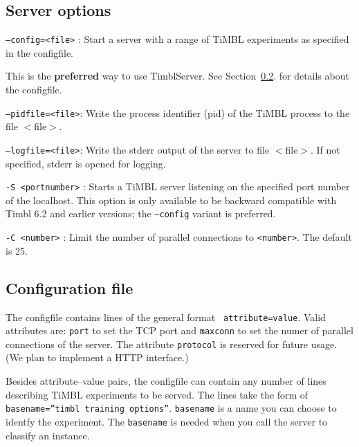 \documentclass{report}
\begin{document}
\subsection{Server options}

\begin{description}

\item {\tt --config=<file>} : Start a server with a range of TiMBL experiments as specified in the configfile.

This is the {\bf preferred} way to use TimblServer. See Section~\ref{configfile}. for details about the configfile.

\item {\tt --pidfile=<file>}: Write the process identifier (pid) of
the TiMBL process to the file $<$file$>$.

\item {\tt --logfile=<file>}: Write the stderr output of the server to
 file $<$file$>$. If not specified, stderr is opened for logging.

\item {\tt -S <portnumber>} : Starts a TiMBL server listening on the
  specified port number of the localhost.  This option is only
  available to be backward compatible with Timbl 6.2 and earlier
  versions; the {\tt --config} variant is preferred.

\item {\tt -C <number>} : Limit the number of parallel connections to
  {\tt <number>}. The default is 25.

\end{description}

\subsection{Configuration file}
\label{configfile}

The configfile contains lines of the general format {\tt
  attribute=value}.  Valid attributes are: {\tt port} to set the TCP
port and {\tt maxconn} to set the numer of parallel connections of the
server. The attribute {\tt protocol} is reserved for future usage. (We
plan to implement a HTTP interface.)

Besides attribute--value pairs, the configfile can contain any
number of lines describing TiMBL experiments to be served. The lines
take the form of {\tt basename=''timbl training options''}.  {\tt basename}
is a name you can choose to identfy the experiment. The {\tt basename}
is needed when you call the server to classify an instance.
\end{document}
